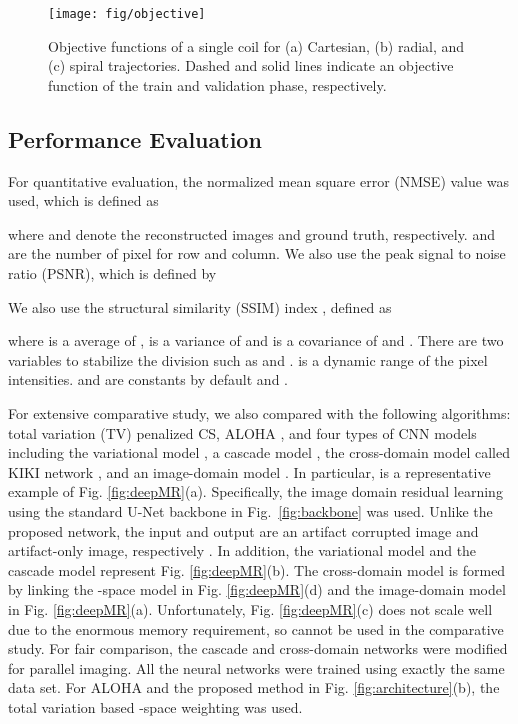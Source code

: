 \documentclass[10pt,journal]{IEEEtran}
\newcommand{\0}{{\boldsymbol{0}}}
\begin{document}
\begin{figure}[!b] 	
\centerline{\texttt{[image: fig/objective]}}
\caption{Objective functions of a single coil for (a) Cartesian, (b) radial, and (c) spiral trajectories. Dashed and solid lines indicate an objective function of the train and validation phase, respectively.}
\label{fig:objective}
\end{figure}


\subsection{Performance Evaluation}

For quantitative evaluation, the normalized mean square error (NMSE) value was used, which is defined as

where  and  denote the reconstructed images and ground truth, respectively.  and  are the number of pixel for row and column.
We also use the peak signal to noise ratio (PSNR), which is defined by

We also use the structural similarity (SSIM) index  \cite{wang2004image}, defined as

where  is a average of ,  is a variance of  and  is a covariance of  and . 
There are two variables to stabilize the division such as  and .
 is a dynamic range of the pixel intensities.  and  are constants by default  and . 

For extensive comparative study, we also compared with the following algorithms:
 total variation (TV) penalized CS,  ALOHA \cite{jin2016general}, and four types of CNN models including the
 variational model \cite{hammernik2018learning}, a cascade model \cite{schlemper2018deep}, the cross-domain model called KIKI network  \cite{eo2018kiki}, and an image-domain model \cite{han2017deep}. In particular,  \cite{han2017deep}  is a representative
 example of  Fig. \ref{fig:deepMR}(a).
Specifically,  the image domain residual learning using the standard U-Net backbone in Fig.~\ref{fig:backbone} was used. 
Unlike the proposed network, the input and output are an artifact corrupted image and artifact-only image, respectively \cite{jin2017deep}.
In addition,  the variational model \cite{hammernik2018learning} and the cascade model \cite{schlemper2018deep}  represent Fig. \ref{fig:deepMR}(b). The cross-domain model is formed by linking the -space model in Fig. \ref{fig:deepMR}(d) and the image-domain model in Fig. \ref{fig:deepMR}(a).  Unfortunately, Fig. \ref{fig:deepMR}(c) does not scale well due to the enormous memory requirement, so cannot be used in the comparative study. 
 For fair comparison, the cascade \cite{schlemper2018deep} and cross-domain \cite{eo2018kiki} networks were modified for
 parallel imaging.   All the neural networks were trained using exactly the same data set.
 For  ALOHA \cite{jin2016general} and the proposed method in Fig. \ref{fig:architecture}(b),
 the  total variation based -space weighting was used.
\end{document}
